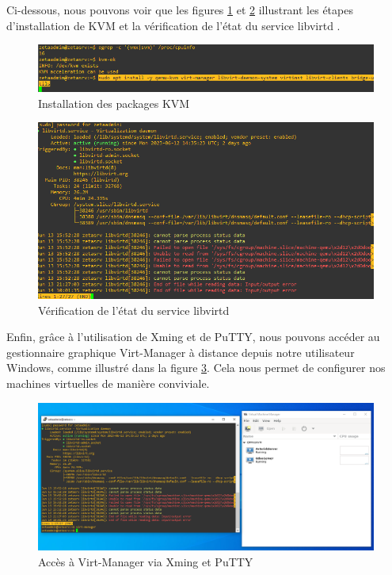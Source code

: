 Ci-dessous, nous pouvons voir que les figures \ref{fig:kvm-installation} et \ref{fig:libvirtd-status} illustrant les étapes d'installation de KVM et la vérification de l'état du service libvirtd  .

\begin{figure}[H]
 \centering
    \includegraphics[width=15cm]{Images/installkvm1.png}
    \caption{Installation des packages KVM}
    \label{fig:kvm-installation}
\end{figure}

\begin{figure}[H]
 \centering
    \includegraphics[width=15cm]{Images/installkvm2.png}
    \caption{Vérification de l'état du service libvirtd}
    \label{fig:libvirtd-status}
\end{figure}

Enfin, grâce à l'utilisation de Xming et de PuTTY, nous pouvons accéder au gestionnaire graphique Virt-Manager à distance depuis notre utilisateur Windows, comme illustré dans la figure \ref{fig:virt-manager-access}. Cela nous permet de configurer nos machines virtuelles de manière conviviale.

\begin{figure}[H]
 \centering
    \includegraphics[width=15cm]{Images/resultvirtmanager.png}
    \caption{Accès à Virt-Manager via Xming et PuTTY}
    \label{fig:virt-manager-access}
\end{figure}

